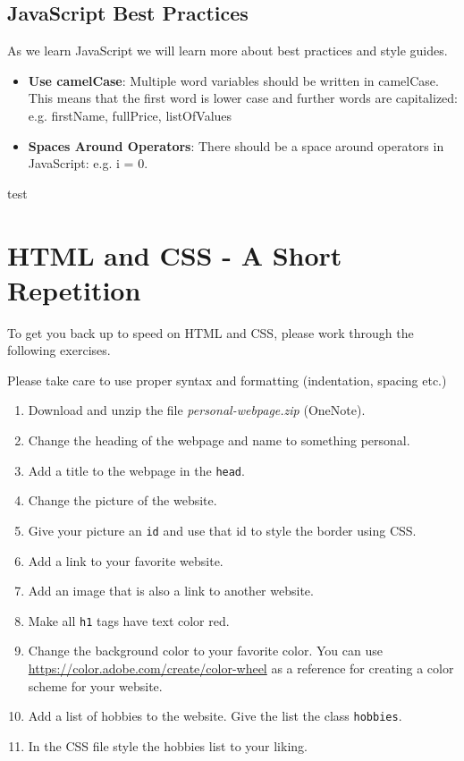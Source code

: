 \documentclass[english,11pt,a4paper]{report}
\newcommand{\bfb}[1]{{\bf \color{blue} #1}}
\begin{document}
\subsection{JavaScript Best Practices}

As we learn JavaScript we will learn more about best practices and style guides. 

\begin{itemize}
\item \bfb{Use camelCase}: Multiple word variables should be written in camelCase.  This means that the first word is lower case and further words are capitalized: e.g. firstName, fullPrice, listOfValues

\item \bfb{Spaces Around Operators}: There should be a space around operators in JavaScript: e.g. i = 0.
\end{itemize} test


\newpage

\section{HTML and CSS - A Short Repetition}

To get you back up to speed on HTML and CSS, please work through the following exercises.

Please take care to use proper syntax and formatting (indentation, spacing etc.)

\begin{ex}
\begin{enumerate}
\item Download and unzip the file \emph{personal-webpage.zip} (OneNote). 
\item Change the heading of the webpage and name to something personal.
\item Add a title to the webpage in the \verb|head|.
\item Change the picture of the website.
\item Give your picture an \verb|id| and use that id to style the border using CSS.
\item Add a link to your favorite website.
\item Add an image that is also a link to another website.
\item Make all \verb|h1| tags have text color red.
\item Change the background color to your favorite color. You can use \url{https://color.adobe.com/create/color-wheel} as a reference for creating a color scheme for your website.
\item Add a list of hobbies to the website.  Give the list the class \verb|hobbies|.
\item In the CSS file style the hobbies list to your liking.
\end{enumerate}
 
\end{ex}
\end{document}
